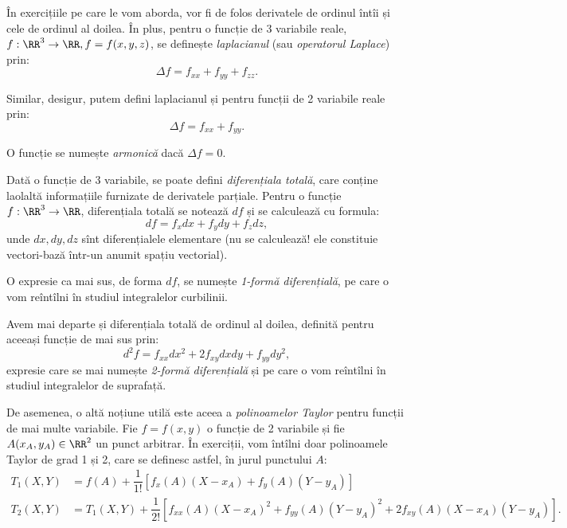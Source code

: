 În exercițiile pe care le vom aborda, vor fi de folos derivatele de ordinul întîi și
cele de ordinul al doilea. În plus, pentru o funcție de 3 variabile reale,
$ f : \RR^3 \to \RR, f = f(x, y, z) $, se definește \emph{laplacianul} (sau
\emph{operatorul Laplace}) prin:
\[
  \Delta f = f_{xx} + f_{yy} + f_{zz}.
\]

Similar, desigur, putem defini laplacianul și pentru funcții de 2 variabile reale prin:
\[
  \Delta f = f_{xx} + f_{yy}.
\]

O funcție se numește \emph{armonică} dacă $ \Delta f = 0 $.

\vspace{1cm}

Dată o funcție de 3 variabile, se poate defini \emph{diferențiala totală},
care conține laolaltă informațiile furnizate de derivatele parțiale. Pentru o
funcție $ f : \RR^3 \to \RR $, diferențiala totală se notează $ df $ și se calculează
cu formula:
\[
  df = f_x dx + f_y dy + f_z dz,
\]
unde $ dx, dy, dz $ sînt diferențialele elementare (nu se calculează! ele
constituie vectori-bază într-un anumit spațiu vectorial).

O expresie ca mai sus, de forma $ df $, se numește \emph{1-formă diferențială},
pe care o vom reîntîlni în studiul integralelor curbilinii.

Avem mai departe și diferențiala totală de ordinul al doilea, definită
pentru aceeași funcție de mai sus prin:
\[
  d^2 f = f_{xx} dx^2 + 2f_{xy} dxdy + f_{yy} dy^2,
\]
expresie care se mai numește \emph{2-formă diferențială} și pe care o
vom reîntîlni în studiul integralelor de suprafață.

\vspace{1cm}

De asemenea, o altă noțiune utilă este aceea a \emph{polinoamelor Taylor}
pentru funcții de mai multe variabile. Fie $ f = f(x, y) $ o funcție
de 2 variabile și fie $ A(x_A, y_A) \in \RR^2 $ un punct arbitrar. În exerciții,
vom întîlni doar polinoamele Taylor de grad 1 și 2, care se definesc astfel,
în jurul punctului $ A $:
\begin{align*}
  T_1(X, Y) &= f(A) + \dfrac{1}{1!}\left[f_x(A)(X - x_A) + f_y(A)(Y - y_A)\right] \\
  T_2(X, Y) &= T_1(X, Y) + \dfrac{1}{2!} \left[ f_{xx}(A)(X - x_A)^2 + f_{yy}(A)(Y - y_A)^2 +%
              2f_{xy}(A)(X - x_A)(Y - y_A) \right].
\end{align*}

